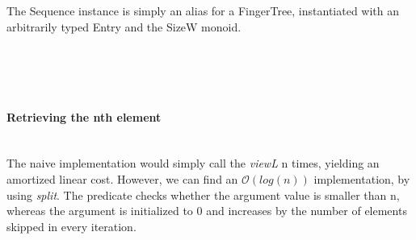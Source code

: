 \documentclass[12pt,twoside,notitlepage]{report}
\begin{document}
The Sequence instance is simply an alias for a FingerTree, instantiated with an arbitrarily typed Entry and the SizeW monoid.

\begin{code}
\\
\>[0]\<[4]%
\>[4] \AgdaSymbol{:}  \AgdaSymbol{\{}\AgdaSymbol{\}(} \AgdaSymbol{:}  \AgdaSymbol{)}    \<%
\\
\>[0]\<[4]%
\>[4] \AgdaSymbol{\{}\AgdaSymbol{\}}   \AgdaSymbol{=}  \AgdaSymbol{(} \AgdaSymbol{)} \AgdaSymbol{(} \AgdaSymbol{\{}\AgdaSymbol{\})} \AgdaSymbol{\{}\AgdaSymbol{\}}\<%
\\
\end{code}

\paragraph{Retrieving the nth element} \mbox{} \\ 
The naive implementation would simply call the \textit{viewL} n times, yielding an amortized linear cost. However, we can find an $\mathcal{O}(log(n))$ implementation, by using \textit{split}. The predicate checks whether the argument value is smaller than n, whereas the argument is initialized to 0 and increases by the number of elements skipped in every iteration.

\begin{code}
\>[0]\<[4]%
\>[4]\AgdaFunction{\_!\_} \AgdaSymbol{:}  \AgdaSymbol{\{}\AgdaSymbol{\}\{} \AgdaSymbol{:}  \AgdaSymbol{\}\{} \AgdaSymbol{:} \AgdaSymbol{\}}         \<%
\\
\>[0]\<[4]%
\>[4] \AgdaFunction{!}       \AgdaSymbol{(} \AgdaSymbol{)}  \AgdaSymbol{)} \AgdaSymbol{(} \AgdaSymbol{)} \<%
\\
\>[0]\<[4]%
\>[4] \AgdaFunction{!}  \AgdaSymbol{|}  \AgdaSymbol{(} \AgdaSymbol{\_}  \AgdaSymbol{\_)} \AgdaSymbol{=}  \AgdaSymbol{(} \AgdaSymbol{)}\<%
\\
\>[0]\<[4]%
\>[4] \AgdaFunction{!}  \AgdaSymbol{|}  \AgdaSymbol{=} \<%
\\
\end{code}
\end{document}
